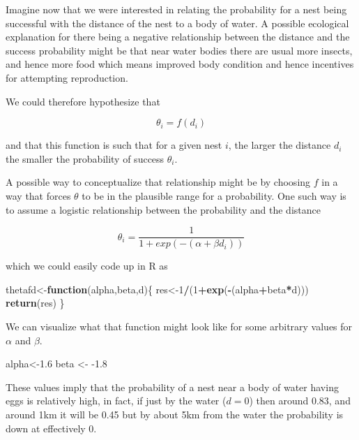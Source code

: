 \documentclass[
]{book}
\newenvironment{Shaded}{\begin{snugshade}}{\end{snugshade}}
\newcommand{\ControlFlowTok}[1]{\textcolor[rgb]{0.13,0.29,0.53}{\textbf{#1}}}
\newcommand{\DecValTok}[1]{\textcolor[rgb]{0.00,0.00,0.81}{#1}}
\newcommand{\FloatTok}[1]{\textcolor[rgb]{0.00,0.00,0.81}{#1}}
\newcommand{\KeywordTok}[1]{\textcolor[rgb]{0.13,0.29,0.53}{\textbf{#1}}}
\newcommand{\NormalTok}[1]{#1}
\newcommand{\OperatorTok}[1]{\textcolor[rgb]{0.81,0.36,0.00}{\textbf{#1}}}
\newcommand{\StringTok}[1]{\textcolor[rgb]{0.31,0.60,0.02}{#1}}
\begin{document}
Imagine now that we were interested in relating the probability for a nest being successful with the distance of the nest to a body of water. A possible ecological explanation for there being a negative relationship between the distance and the success probability might be that near water bodies there are usual more insects, and hence more food which means improved body condition and hence incentives for attempting reproduction.

We could therefore hypothesize that

\[\theta_i=f(d_i)\]

and that this function is such that for a given nest \(i\), the larger the distance \(d_i\) the smaller the probability of success \(\theta_i\).

A possible way to conceptualize that relationship might be by choosing \(f\) in a way that forces \(\theta\) to be in the plausible range for a probability. One such way is to assume a logistic relationship between the probability and the distance

\[\theta_i=\frac{1}{1+exp(-(\alpha+\beta d_i))}\]

which we could easily code up in R as

\begin{Shaded}
\begin{Highlighting}[]
\NormalTok{thetafd<-}\ControlFlowTok{function}\NormalTok{(alpha,beta,d)\{}
\NormalTok{  res<-}\DecValTok{1}\OperatorTok{/}\NormalTok{(}\DecValTok{1}\OperatorTok{+}\KeywordTok{exp}\NormalTok{(}\OperatorTok{-}\NormalTok{(alpha}\OperatorTok{+}\NormalTok{beta}\OperatorTok{*}\NormalTok{d)))}
  \KeywordTok{return}\NormalTok{(res)}
\NormalTok{\}}
\end{Highlighting}
\end{Shaded}

We can visualize what that function might look like for some arbitrary values for \(\alpha\) and \(\beta\).

\begin{Shaded}
\begin{Highlighting}[]
\NormalTok{alpha<-}\FloatTok{1.6}
\NormalTok{beta <-}\StringTok{ }\FloatTok{-1.8}
\end{Highlighting}
\end{Shaded}

These values imply that the probability of a nest near a body of water having eggs is relatively high, in fact, if just by the water (\(d=0\)) then around 0.83, and around 1km it will be 0.45 but by about 5km from the water the probability is down at effectively 0.
\end{document}
